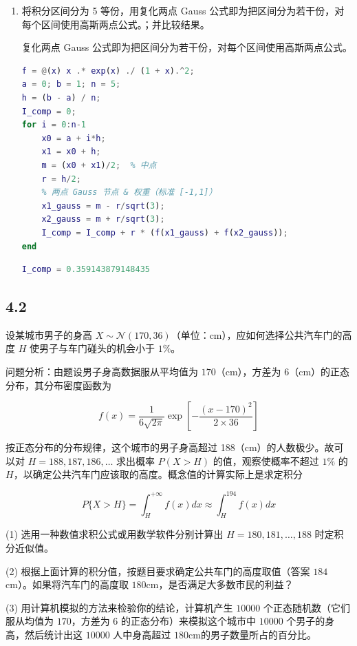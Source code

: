 \begin{enumerate}
\begin{lstlisting}[language=matlab]
% 计算积分近似值
I_approx = sum(weights .* f(nodes));
% 显示结果
fprintf('8点Gauss公式近似值: %.15f\n', I_approx);
\end{lstlisting}
    \item 将积分区间分为 5 等份，用复化两点 Gauss 公式即为把区间分为若干份，对每个区间使用高斯两点公式。；并比较结果。
    
    复化两点 Gauss 公式即为把区间分为若干份，对每个区间使用高斯两点公式。
\begin{lstlisting}[language=matlab]
f = @(x) x .* exp(x) ./ (1 + x).^2;
a = 0; b = 1; n = 5;
h = (b - a) / n;
I_comp = 0;
for i = 0:n-1
    x0 = a + i*h;
    x1 = x0 + h;
    m = (x0 + x1)/2;  % 中点
    r = h/2;
    % 两点 Gauss 节点 & 权重（标准 [-1,1]）
    x1_gauss = m - r/sqrt(3);
    x2_gauss = m + r/sqrt(3);
    I_comp = I_comp + r * (f(x1_gauss) + f(x2_gauss));
end
\end{lstlisting}
\begin{lstlisting}[language=matlab]
I_comp = 0.359143879148435
\end{lstlisting}
\end{enumerate}



\subsection*{4.2}
设某城市男子的身高 $X\sim \mathcal{N}(170, 36)$（单位：cm），应如何选择公共汽车门的高度 $H$ 使男子与车门碰头的机会小于 $1\%$。

问题分析：由题设男子身高数据服从平均值为 $170$（cm），方差为 $6$（cm）的正态分布，其分布密度函数为

\[ f(x) = \frac{1}{6\sqrt{2\pi}} \exp\left[-\frac{(x-170)^2}{2 \times 36}\right] \]

按正态分布的分布规律，这个城市的男子身高超过 188（cm）的人数极少。故可以对 $H=188, 187, 186, \dots$ 求出概率 $P(X > H)$ 的值，观察使概率不超过 $1\%$ 的 $H$，以确定公共汽车门应该取的高度。概念值的计算实际上是求定积分

\[ P\{X > H\} = \int_{H}^{+\infty} f(x) dx \approx \int_{H}^{194} f(x) dx \]

(1) 选用一种数值求积公式或用数学软件分别计算出 $H=180, 181, …, 188$ 时定积分近似值。

(2) 根据上面计算的积分值，按题目要求确定公共车门的高度取值（答案 $184$cm）。如果将汽车门的高度取 $180$cm，是否满足大多数市民的利益？

(3) 用计算机模拟的方法来检验你的结论，计算机产生 $10000$ 个正态随机数（它们服从均值为 $170$，方差为 $6$ 的正态分布）来模拟这个城市中 $10000$ 个男子的身高，然后统计出这 $10000$ 人中身高超过 $180$cm的男子数量所占的百分比。


